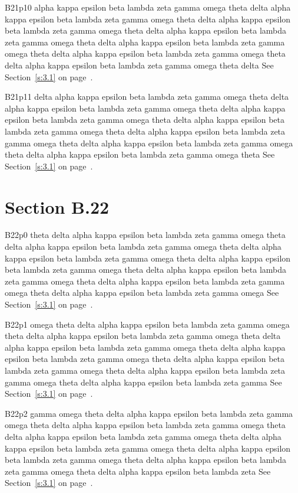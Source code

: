 B21p10 alpha kappa epsilon beta lambda zeta gamma omega theta delta alpha kappa epsilon beta lambda zeta gamma omega theta delta alpha kappa epsilon beta lambda zeta gamma omega theta delta alpha kappa epsilon beta lambda zeta gamma omega theta delta alpha kappa epsilon beta lambda zeta gamma omega theta delta alpha kappa epsilon beta lambda zeta gamma omega theta delta alpha kappa epsilon beta lambda zeta gamma omega theta delta See Section~\ref{s:3.1} on page~\pageref{s:3.1}.

B21p11 delta alpha kappa epsilon beta lambda zeta gamma omega theta delta alpha kappa epsilon beta lambda zeta gamma omega theta delta alpha kappa epsilon beta lambda zeta gamma omega theta delta alpha kappa epsilon beta lambda zeta gamma omega theta delta alpha kappa epsilon beta lambda zeta gamma omega theta delta alpha kappa epsilon beta lambda zeta gamma omega theta delta alpha kappa epsilon beta lambda zeta gamma omega theta See Section~\ref{s:3.1} on page~\pageref{s:3.1}.

\section{Section B.22}\label{s:B.22}
B22p0 theta delta alpha kappa epsilon beta lambda zeta gamma omega theta delta alpha kappa epsilon beta lambda zeta gamma omega theta delta alpha kappa epsilon beta lambda zeta gamma omega theta delta alpha kappa epsilon beta lambda zeta gamma omega theta delta alpha kappa epsilon beta lambda zeta gamma omega theta delta alpha kappa epsilon beta lambda zeta gamma omega theta delta alpha kappa epsilon beta lambda zeta gamma omega See Section~\ref{s:3.1} on page~\pageref{s:3.1}.

B22p1 omega theta delta alpha kappa epsilon beta lambda zeta gamma omega theta delta alpha kappa epsilon beta lambda zeta gamma omega theta delta alpha kappa epsilon beta lambda zeta gamma omega theta delta alpha kappa epsilon beta lambda zeta gamma omega theta delta alpha kappa epsilon beta lambda zeta gamma omega theta delta alpha kappa epsilon beta lambda zeta gamma omega theta delta alpha kappa epsilon beta lambda zeta gamma See Section~\ref{s:3.1} on page~\pageref{s:3.1}.

B22p2 gamma omega theta delta alpha kappa epsilon beta lambda zeta gamma omega theta delta alpha kappa epsilon beta lambda zeta gamma omega theta delta alpha kappa epsilon beta lambda zeta gamma omega theta delta alpha kappa epsilon beta lambda zeta gamma omega theta delta alpha kappa epsilon beta lambda zeta gamma omega theta delta alpha kappa epsilon beta lambda zeta gamma omega theta delta alpha kappa epsilon beta lambda zeta See Section~\ref{s:3.1} on page~\pageref{s:3.1}.


